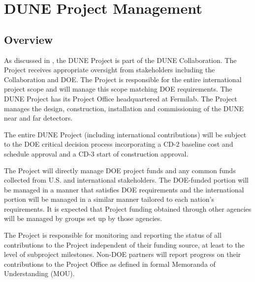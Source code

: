 \chapter{DUNE Project Management}
\label{ch:detectors-pm}

\section{Overview}




As discussed in \volintro, the DUNE Project is part of the DUNE
Collaboration. The Project receives appropriate oversight from
stakeholders including the Collaboration and DOE. The Project is
responsible for the entire international project scope and will manage
this scope matching DOE requirements. The DUNE Project has its Project Office
headquartered at Fermilab.
The Project manages the design, construction, installation and
commissioning of the DUNE near and far detectors.

The entire DUNE Project (including international contributions)
will be subject to the DOE critical decision process incorporating a
CD-2 baseline cost and schedule approval and a CD-3 start of construction approval.

The Project will directly manage DOE project funds and any common
funds collected from U.S. and international stakeholders. The
DOE-funded portion will be managed in a manner that satisfies DOE
requirements and the international portion will be managed in a
similar manner tailored to each nation's requirements. It is expected
that Project funding obtained through other agencies will be managed
by groups set up by those agencies.

The Project is responsible for monitoring and reporting the status of
all contributions to the Project independent of their funding source,
at least to the level of subproject milestones.  Non-DOE partners will
report progress on their contributions to the Project Office as
defined in formal Memoranda of Understanding (MOU).

